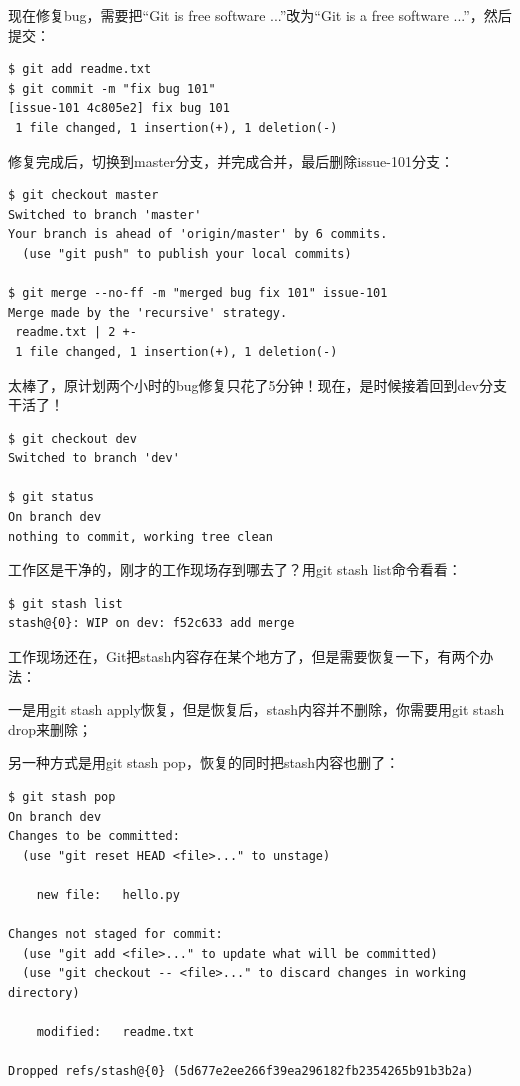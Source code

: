 现在修复bug，需要把“Git is free software ...”改为“Git is a free software ...”，然后提交：

\begin{verbatim}
$ git add readme.txt 
$ git commit -m "fix bug 101"
[issue-101 4c805e2] fix bug 101
 1 file changed, 1 insertion(+), 1 deletion(-)
\end{verbatim}

修复完成后，切换到master分支，并完成合并，最后删除issue-101分支：

\begin{verbatim}
$ git checkout master
Switched to branch 'master'
Your branch is ahead of 'origin/master' by 6 commits.
  (use "git push" to publish your local commits)

$ git merge --no-ff -m "merged bug fix 101" issue-101
Merge made by the 'recursive' strategy.
 readme.txt | 2 +-
 1 file changed, 1 insertion(+), 1 deletion(-)
\end{verbatim}

太棒了，原计划两个小时的bug修复只花了5分钟！现在，是时候接着回到dev分支干活了！

\begin{verbatim}
$ git checkout dev
Switched to branch 'dev'

$ git status
On branch dev
nothing to commit, working tree clean
\end{verbatim}

工作区是干净的，刚才的工作现场存到哪去了？用git stash list命令看看：

\begin{verbatim}
$ git stash list
stash@{0}: WIP on dev: f52c633 add merge
\end{verbatim}

工作现场还在，Git把stash内容存在某个地方了，但是需要恢复一下，有两个办法：

一是用git stash apply恢复，但是恢复后，stash内容并不删除，你需要用git stash drop来删除；

另一种方式是用git stash pop，恢复的同时把stash内容也删了：

\begin{verbatim}
$ git stash pop
On branch dev
Changes to be committed:
  (use "git reset HEAD <file>..." to unstage)

	new file:   hello.py

Changes not staged for commit:
  (use "git add <file>..." to update what will be committed)
  (use "git checkout -- <file>..." to discard changes in working directory)

	modified:   readme.txt

Dropped refs/stash@{0} (5d677e2ee266f39ea296182fb2354265b91b3b2a)
\end{verbatim}

